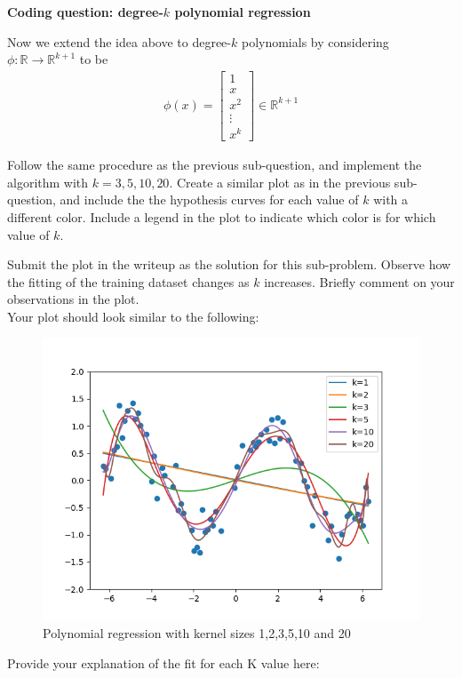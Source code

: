 \item {} {\bf Coding question: degree-$k$ polynomial regression}

Now we extend the idea above to degree-$k$ polynomials by considering $\phi:\mathbb{R}\rightarrow \mathbb{R}^{k+1}$ to be 
		\begin{align}
	\phi(x) = \left[\begin{array}{c} 1\\ x \\ x^2\\ \vdots \\x^k \end{array}\right]\in \mathbb{R}^{k+1} \label{eqn:feature-k}
	\end{align}

Follow the same procedure as the previous sub-question, and implement the algorithm with $k=3,5,10,20$. Create a similar plot as in the previous sub-question, and include the the hypothesis curves for each value of $k$ with a different color. Include a legend in the plot to indicate which color is for which value of $k$.


Submit the plot in the writeup as the solution for this sub-problem. Observe how the fitting of the training dataset changes as $k$ increases. Briefly comment on your observations in the plot.\\

Your plot should look similar to the following:
\begin{figure}[H]
  \centering
  \includegraphics[width=0.65\linewidth]{featuremaps/src/large-poly.png}
  \centering
\caption{Polynomial regression with kernel sizes 1,2,3,5,10 and 20}
\end{figure}

Provide your explanation of the fit for each K value here:\\[50pt]